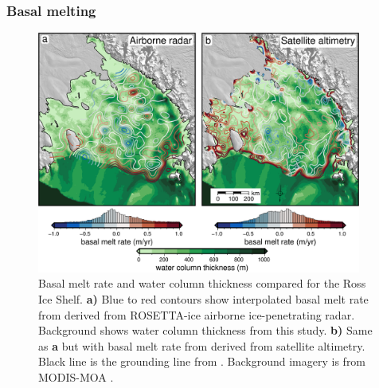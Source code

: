 \subsubsection{Basal melting}

\begin{figure}[!ht]
    \centering
    \includegraphics[width=0.95\textwidth]{figures/chp4/RIS_basal_melt.png}
    \caption[Basal melt]{Basal melt rate and water column thickness compared for the Ross Ice Shelf. \textbf{a)} Blue to red contours show interpolated basal melt rate from \citet{dasmulti2020} derived from ROSETTA-ice airborne ice-penetrating radar. Background shows water column thickness from this study. \textbf{b)} Same as \textbf{a} but with basal melt rate from \citet{adusumilliinterannual2020} derived from satellite altimetry. Black line is the grounding line from \citet{mouginotmeasures2017}. Background imagery is from MODIS-MOA \citep{scambosmodisbased2007}.}
    \label{fig:chp4_basal_melt}
\end{figure}

